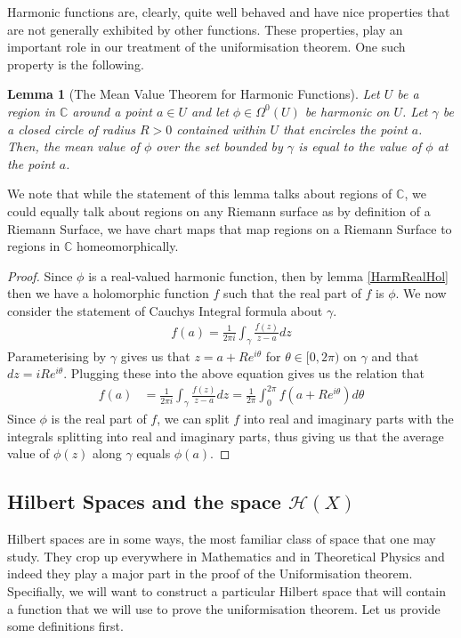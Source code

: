 \documentclass[11pt]{report}
\newtheorem{lemma}[thm]{Lemma}
\theoremstyle{definition}
\begin{document}
Harmonic functions are, clearly, quite well behaved and have nice properties that are not generally exhibited by other functions. These properties, play an important role in our treatment of the uniformisation theorem. One such property is the following.

\begin{lemma}[The Mean Value Theorem for Harmonic Functions]\label{MVT}
  Let $U$ be a region in $\mathbb{C}$ around a point $a \in U$ and let $\phi \in \Omega^0(U)$ be harmonic on $U$. Let $\gamma$ be a closed circle of radius $R > 0$ contained within $U$ that encircles the point $a$. Then, the mean value of $\phi$ over the set bounded by $\gamma$ is equal to the value of $\phi$ at the point $a$. 
\end{lemma}
We note that while the statement of this lemma talks about regions of $\mathbb{C}$, we could equally talk about regions on any Riemann surface as by definition of a Riemann Surface, we have chart maps that map regions on a Riemann Surface to regions in $\mathbb{C}$ homeomorphically. 
\begin{proof}
  Since $\phi$ is a real-valued harmonic function, then by lemma \ref{HarmRealHol} then we have a holomorphic function $f$ such that the real part of $f$ is $\phi$. We now consider the statement of Cauchys Integral formula about $\gamma$.
  \begin{align*}
    f(a) = \frac{1}{2\pi i}\int_{\gamma}\frac{f(z)}{z-a}dz
  \end{align*}
  Parameterising by $\gamma$ gives us that $z= a + Re^{i\theta}$ for $\theta \in [0, 2\pi)$ on $\gamma$ and that $dz = iRe^{i\theta}$. Plugging these into the above equation gives us the relation that
  \begin{align*}
    f(a) &= \frac{1}{2\pi i}\int_{\gamma}\frac{f(z)}{z-a}dz = \frac{1}{2\pi}\int_0^{2\pi}f(a+Re^{i\theta})d\theta
  \end{align*}
  Since $\phi$ is the real part of $f$, we can split $f$ into real and imaginary parts with the integrals splitting into real and imaginary parts, thus giving us that the average value of $\phi(z)$ along $\gamma$ equals $\phi(a)$.
\end{proof}

\subsection{Hilbert Spaces and the space $\mathcal{H}(X)$}

Hilbert spaces are in some ways, the most familiar class of space that one may study. They crop up everywhere in Mathematics and in Theoretical Physics and indeed they play a major part in the proof of the Uniformisation theorem. Specifially, we will want to construct a particular Hilbert space that will contain a function that we will use to prove the uniformisation theorem. Let us provide some definitions first.
\end{document}
